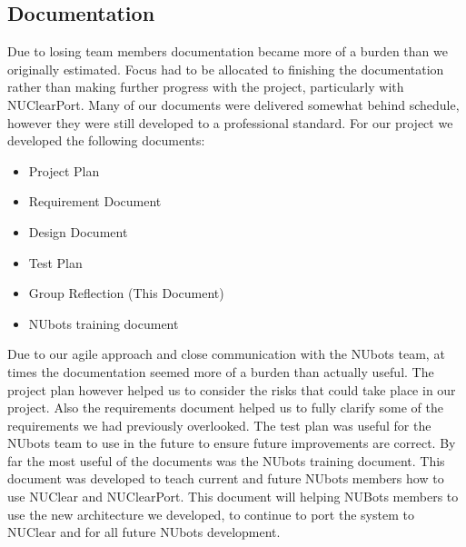 \documentclass[english,12pt]{scrartcl}
\begin{document}
	\subsection{Documentation}
		Due to losing team members documentation became more of a burden than we originally estimated.
		Focus had to be allocated to finishing the documentation rather than making further progress with the project, particularly with NUClearPort.
		Many of our documents were delivered somewhat behind schedule, however they were still developed to a professional standard.
		For our project we developed the following documents:
		\begin{itemize}
			\item Project Plan
			\item Requirement Document
			\item Design Document
			\item Test Plan
			\item Group Reflection (This Document)
			\item NUbots training document
		\end{itemize}
		
		Due to our agile approach and close communication with the NUbots team, at times the documentation seemed more of a burden than actually useful. 
		The project plan however helped us to consider the risks that could take place in our project.
		Also the requirements document helped us to fully clarify some of the requirements we had previously overlooked.
		The test plan was useful for the NUbots team to use in the future to ensure future improvements are correct.
		By far the most useful of the documents was the NUbots training document.
		This document was developed to teach current and future NUbots members how to use NUClear and NUClearPort.
		This document will helping NUBots members to use the new architecture we developed, to continue to port the system to NUClear and for all future NUbots development.

		
	
\end{document}
